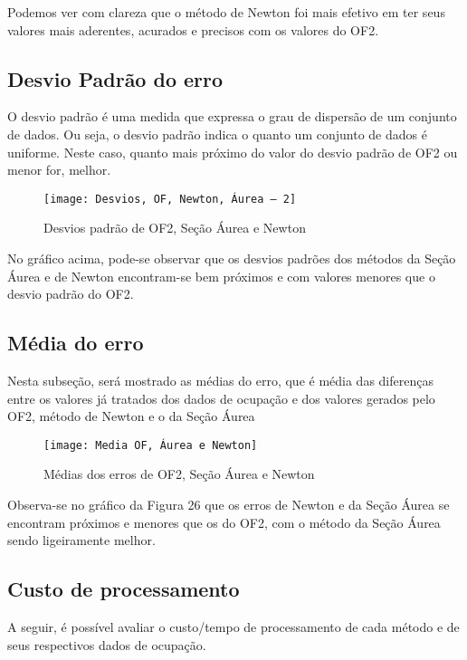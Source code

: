 Podemos ver com clareza que o método de Newton foi mais efetivo em ter seus valores mais aderentes, acurados e precisos com os valores do OF2. 

\subsection{Desvio Padrão do erro}
O desvio padrão é uma medida que expressa o grau de dispersão de um conjunto de dados. Ou seja, o desvio padrão indica o quanto um conjunto de dados é uniforme. Neste caso, quanto mais próximo do valor do desvio padrão de OF2 ou menor for, melhor.

\begin{figure}[H]
    \centering
    \caption{Desvios padrão de OF2, Seção Áurea e Newton}
    \texttt{[image: Desvios, OF, Newton, Áurea -- 2]}
    \label{modeloNfce}
\end{figure}

No gráfico acima, pode-se observar que os desvios padrões dos métodos da Seção Áurea e de Newton encontram-se bem próximos e com valores menores que o desvio padrão do OF2.

\subsection{Média do erro}

Nesta subseção, será mostrado as médias do erro, que é média das diferenças entre os valores já tratados dos dados de ocupação e dos valores gerados pelo OF2, método de Newton e o da Seção Áurea


\begin{figure}[H]
    \centering
    \caption{Médias dos erros de OF2, Seção Áurea e Newton}
    \texttt{[image: Media OF, Áurea e Newton]}
    \label{modeloNfce}
\end{figure}

Observa-se no gráfico da Figura 26 que os erros de Newton e da Seção Áurea se encontram próximos e menores que os do OF2, com o método da Seção Áurea sendo ligeiramente melhor.

\subsection{Custo de processamento}

A seguir, é possível avaliar o custo/tempo de processamento de cada método e de seus respectivos dados de ocupação.

